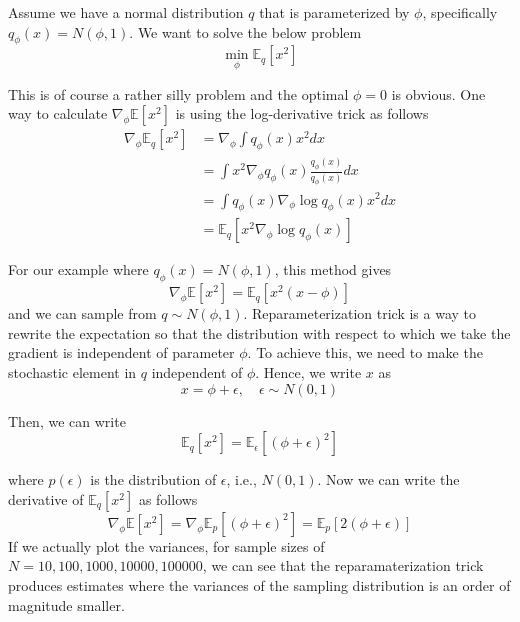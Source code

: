   \begin{example}[Gradient of Expection of $f(x) = x^2$ w.r.t. Gaussian]
    Assume we have a normal distribution $q$ that is parameterized by $\phi$, specifically
    $q_\phi(x) = N(\phi, 1)$. We want to solve the below problem
    \begin{equation}
      \min_\phi \mathbb{E}_q[x^2]
    \end{equation}

    This is of course a rather silly problem and the optimal $\phi = 0$ is obvious. One way to calculate $\nabla_\phi \mathbb{E}[x^2]$ is using the log-derivative trick as follows
    \begin{align}
      \nabla_\phi \mathbb{E}_q[x^2] &= \nabla_\phi\int q_\phi(x)x^2dx \\
      &= \int x^2\nabla_\phi q_\phi(x)\frac{q_\phi(x)}{q_\phi(x)}dx \\
      &= \int q_\phi(x)\nabla_\phi\log q_\phi(x)x^2dx \\
      &= \mathbb{E}_q[x^2\nabla_\phi\log q_\phi(x)]
    \end{align}

    For our example where $q_\phi(x) = N(\phi, 1)$, this method gives
    \begin{equation}
      \nabla_\phi \mathbb{E}[x^2] = \mathbb{E}_q[x^2(x-\phi)]
    \end{equation}
    and we can sample from $q \sim N(\phi, 1)$. Reparameterization trick is a way to rewrite the expectation so that the distribution with respect to which we take the gradient is independent of parameter $\phi$. To achieve this, we need to make the stochastic element in $q$ independent of $\phi$. Hence, we write $x$ as
    \begin{equation}
      x = \phi+ \epsilon, \quad \epsilon \sim N(0,1)
    \end{equation}

    Then, we can write
    \begin{equation}
      \mathbb{E}_q[x^2] = \mathbb{E}_{\epsilon} [(\phi+ \epsilon)^2]
    \end{equation}

    where $p(\epsilon)$ is the distribution of $\epsilon$, i.e., $N(0,1)$. Now we can write the derivative of $\mathbb{E}_q[x^2]$ as
    follows
    \begin{equation}
      \nabla_\phi \mathbb{E}[x^2] = \nabla_\phi \mathbb{E}_p[(\phi+ \epsilon)^2] = \mathbb{E}_p[2(\phi+ \epsilon)]
    \end{equation}
    If we actually plot the variances, for sample sizes of $N = 10, 100, 1000, 10000, 100000$, we can see that the reparamaterization trick produces estimates where the variances of the sampling distribution is an order of magnitude smaller. 


\end{example}
